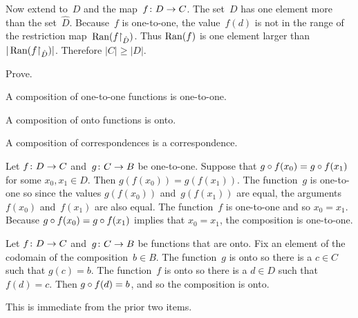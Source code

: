 \documentclass{test}  %
\begin{document}
\begin{ex}
\begin{ans}
\begin{exes}
  Now extend to~$D$ and the map~$\mbox{$f\colon D\to C$}$.
  The set~$D$ has one element more than the set~$\hat{D}$.
  Because~$f$ is one-to-one, the value~$f(d)$ is not in 
  the range of the restriction map~$\operatorname{Ran}({f}\mathord\upharpoonright_{\hat{D}})$.
  Thus $\operatorname{Ran}(f)$ is one element larger than
  $|\operatorname{Ran}({f}\mathord\upharpoonright_{\hat{D}})|$.
  Therefore $|C|\geq|D|$.
\end{exes}
\end{ans}
\end{ex}

\begin{ex} \label{InteractionOneToONeOntoWithComposition}
Prove.
\begin{exes}
\item A composition of one-to-one functions is one-to-one.
\item A composition of onto functions is onto.
\item A composition of correspondences is a correspondence.    
\end{exes}
\begin{ans}
\begin{exes}
\item Let $\mbox{$f\colon D\to C$}$ and~$\mbox{$g\colon C\to B$}$ be one-to-one.
  Suppose that $g\mathbin{\circ} f(x_0)=g\mathbin{\circ} f(x_1)$ for
  some $x_0,x_1\in D$.
  Then $g(f(x_0))=g(f(x_1))$.
  The function~$g$ is one-to-one so since the values $g(f(x_0))$ 
  and~$g(f(x_1))$ are equal, the arguments $f(x_0)$ and~$f(x_1)$ are
  also equal.
  The function~$f$ is one-to-one and so $x_0=x_1$.
  Because $g\mathbin{\circ} f(x_0)=g\mathbin{\circ} f(x_1)$ implies that
  $x_0=x_1$, the composition is one-to-one.
\item Let $\mbox{$f\colon D\to C$}$ and~$\mbox{$g\colon C\to B$}$ be functions that are onto.
  Fix an element of the codomain of the composition~$b\in B$.
  The function~$g$ is onto so there is a $c\in C$ such that $g(c)=b$.
  The function~$f$ is onto so there is a $d\in D$ such that $f(d)=c$.
  Then $g\mathbin{\circ} f(d)=b$, and so the composition is onto.
\item This is immediate from the prior two items. 
\end{exes}
\end{ans}
\end{ex}
\end{document}
